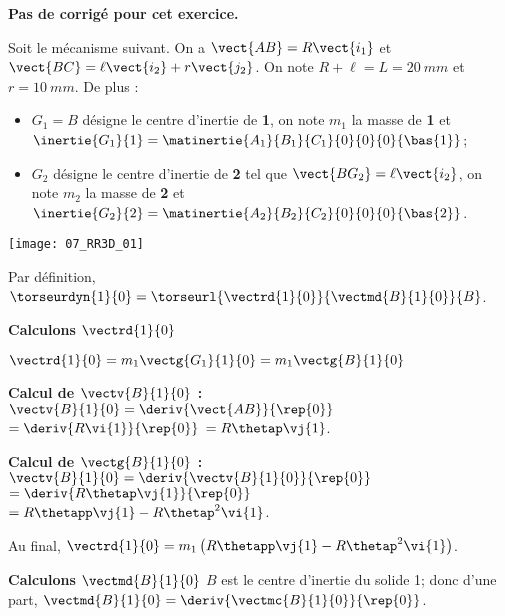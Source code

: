 \normalfalse \difficiletrue \tdifficilefalse
\correctiontrue


\setcounter{numques}{0}
\ifcorrection
\else
\textbf{Pas de corrigé pour cet exercice.}
\fi

\ifprof
\else
Soit le mécanisme suivant. On a $\vect{AB}=R\vect{i_1}$ et $\vect{BC}=\ell\vect{i_2}+r\vect{j_2}$. On note $R+\ell=L = \SI{20}{mm}$ et $r=\SI{10}{mm}$. De plus :
\begin{itemize}
\item $G_1=B$ désigne le centre d'inertie de \textbf{1}, on note $m_1$ la masse de \textbf{1} et $\inertie{G_1}{1}=\matinertie{A_1}{B_1}{C_1}{0}{0}{0}{\bas{1}}$; 
\item $G_2$ désigne le centre d'inertie de \textbf{2} tel que  $\vect{BG_2}=\ell\vect{i_2}$, on note $m_2$ la masse de \textbf{2} et $\inertie{G_2}{2}=\matinertie{A_2}{B_2}{C_2}{0}{0}{0}{\bas{2}}$.
\end{itemize}
\begin{center}
\texttt{[image: 07\_RR3D\_01]}
\end{center}
\fi

\ifprof

Par définition, $\torseurdyn{1}{0} = \torseurl{\vectrd{1}{0}}{\vectmd{B}{1}{0}}{B}$.

\textbf{Calculons $\vectrd{1}{0}$}

$\vectrd{1}{0} = m_1\vectg{G_1}{1}{0}=m_1 \vectg{B}{1}{0} $

 \textbf{Calcul de $\vectv{B}{1}{0}$ : }  
$\vectv{B}{1}{0}=\deriv{\vect{AB}}{\rep{0}}$ 
$=\deriv{ R\vi{1}}{\rep{0}}$  
$= R\thetap \vj{1}$.


 \textbf{Calcul de $\vectg{B}{1}{0}$ : }  
$\vectv{B}{1}{0}=\deriv{\vectv{B}{1}{0}}{\rep{0}}$ 
$=\deriv{ R\thetap \vj{1}}{\rep{0}}$  
$=  R\thetapp \vj{1}-R\thetap^2 \vi{1}$.

Au final, $\vectrd{1}{0}= m_1\left(R\thetapp \vj{1}-R\thetap^2 \vi{1}\right)$.
\vspace{.5cm}

\textbf{Calculons $\vectmd{B}{1}{0}$}
$B$ est le centre d'inertie du solide 1; donc 
 d'une part, $\vectmd{B}{1}{0} = \deriv{\vectmc{B}{1}{0} }{\rep{0}}$.
 
